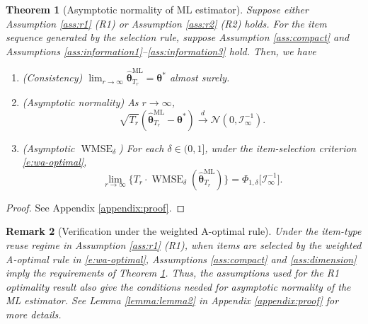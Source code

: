 \documentclass[12pt]{article}
\newcommand{\bftheta}{\boldsymbol{\theta}}
\newtheorem{theorem}{Theorem}[section]
\newtheorem{remark}[theorem]{Remark}
\begin{document}
\begin{theorem}[Asymptotic normality of ML estimator]
\label{thm:normality}
Suppose either Assumption \ref{ass:r1} (R1) or Assumption \ref{ass:r2} (R2) holds. For the item sequence generated by the selection rule, suppose %
Assumption \ref{ass:compact} and Assumptions \ref{ass:information1}--\ref{ass:information3} hold. 
Then, we have
\begin{enumerate}
\item (Consistency) $\lim_{r\to\infty} \hat{\bftheta}^{\mathrm{ML}}_{T_r}=\bftheta^{\ast}$ almost surely. 
\item (Asymptotic normality) As $r \to \infty$,
\begin{equation}
\sqrt{T_r}(\hat{\bftheta}^{\mathrm{ML}}_{T_r}- \bftheta^{\ast})\overset{d}{\to} \mathcal{N}(0, \mathcal{I}_\infty^{-1}).
\end{equation}
\item (Asymptotic $\operatorname{WMSE}_{\delta}$) For each $\delta \in (0,1]$, under the item-selection criterion \eqref{e:wa-optimal},
$$
\lim_{r\to\infty}\{ T_r\cdot \operatorname{WMSE}_\delta(\hat{\bftheta}_{T_r}^{\mathrm{ML}})\} = \Phi_{1,\delta} \Big[ \mathcal{I}_{\infty}^{-1} \Big].
$$
\end{enumerate}
\end{theorem}
\begin{proof}
See Appendix \ref{appendix:proof}.
\end{proof}

\begin{remark}[Verification under the weighted A-optimal rule]
\label{rem:r1-normality-verification}
Under the item-type reuse regime in Assumption \ref{ass:r1} (R1), when items are selected by the weighted A-optimal rule in \eqref{e:wa-optimal}, Assumptions \ref{ass:compact} and \ref{ass:dimension} imply the requirements of Theorem \ref{thm:normality}. Thus, the assumptions used for the R1 optimality result also give the conditions needed for asymptotic normality of the ML estimator. See Lemma \ref{lemma:lemma2} in Appendix \ref{appendix:proof} for more details.
\end{remark}
\end{document}
